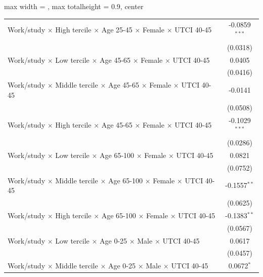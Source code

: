 \begin{table}[htbp]
\begin{adjustbox}{max width = \textwidth, max totalheight = 0.9\textheight, center}
\begin{tabular}{lc}
         Work/study $\times$ High tercile $\times$ Age 25-45 $\times$ Female $\times$ UTCI 40-45        & -0.0859$^{***}$\\   
                                                                                                        & (0.0318)\\   
         Work/study $\times$ Low tercile $\times$ Age 45-65 $\times$ Female $\times$ UTCI 40-45         & 0.0405\\   
                                                                                                        & (0.0416)\\   
         Work/study $\times$ Middle tercile $\times$ Age 45-65 $\times$ Female $\times$ UTCI 40-45      & -0.0141\\   
                                                                                                        & (0.0508)\\   
         Work/study $\times$ High tercile $\times$ Age 45-65 $\times$ Female $\times$ UTCI 40-45        & -0.1029$^{***}$\\   
                                                                                                        & (0.0286)\\   
         Work/study $\times$ Low tercile $\times$ Age 65-100 $\times$ Female $\times$ UTCI 40-45        & 0.0821\\   
                                                                                                        & (0.0752)\\   
         Work/study $\times$ Middle tercile $\times$ Age 65-100 $\times$ Female $\times$ UTCI 40-45     & -0.1557$^{**}$\\   
                                                                                                        & (0.0625)\\   
         Work/study $\times$ High tercile $\times$ Age 65-100 $\times$ Female $\times$ UTCI 40-45       & -0.1383$^{**}$\\   
                                                                                                        & (0.0567)\\   
         Work/study $\times$ Low tercile $\times$ Age 0-25 $\times$ Male $\times$ UTCI 40-45            & 0.0617\\   
                                                                                                        & (0.0457)\\   
         Work/study $\times$ Middle tercile $\times$ Age 0-25 $\times$ Male $\times$ UTCI 40-45         & 0.0672$^{*}$\\   

\end{tabular}
\end{adjustbox}
\end{table}
